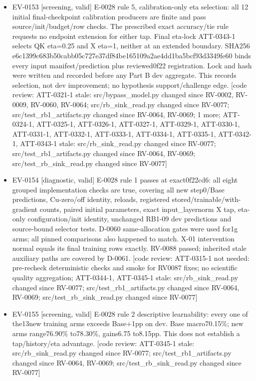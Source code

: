 \documentclass[11pt]{article}
\begin{document}
\begin{itemize}
\item EV-0153 [screening, valid] E-0028 rule 5, calibration-only eta selection: all 12 initial final-checkpoint calibration producers are finite and pass source/init/budget/row checks. The prescribed exact accuracy/tie rule requests no endpoint extension for either tap. Final eta-lock ATT-0343-1 selects QK eta=0.25 and X eta=1, neither at an extended boundary. SHA256 e6c1399c683b50cabb05c727e37df84be165109a2ae4dd1ba5bcf93d3349fe60 binds every input manifest/prediction plus reviewed0f22 registration. Lock and hash were written and recorded before any Part B dev aggregate. This records selection, not dev improvement; no hypothesis support/challenge edge. [code review: ATT-0321-1 stale: src/bypass\_model.py changed since RV-0002, RV-0009, RV-0060, RV-0064; src/rb\_sink\_read.py changed since RV-0077; src/test\_rb1\_artifacts.py changed since RV-0064, RV-0069; 1 more; ATT-0324-1, ATT-0325-1, ATT-0326-1, ATT-0327-1, ATT-0329-1, ATT-0330-1, ATT-0331-1, ATT-0332-1, ATT-0333-1, ATT-0334-1, ATT-0335-1, ATT-0342-1, ATT-0343-1 stale: src/rb\_sink\_read.py changed since RV-0077; src/test\_rb1\_artifacts.py changed since RV-0064, RV-0069; src/test\_rb\_sink\_read.py changed since RV-0077]
\item EV-0154 [diagnostic, valid] E-0028 rule 1 passes at exact0f22cd6: all eight grouped implementation checks are true, covering all new step0/Base predictions, Cu-zero/off identity, reloads, registered stored/trainable/with-gradient counts, paired initial parameters, exact input\_layernorm X tap, eta-only configuration/init identity, unchanged RB1-09 dev predictions and source-bound selector tests. D-0060 same-allocation gates were used for1g arms; all pinned comparisons also happened to match. X-01 intervention normal equals its final training rows exactly. RV-0088 passed; inherited stale auxiliary paths are covered by D-0061. [code review: ATT-0315-1 not needed: pre-recheck deterministic checks and smoke for RV0087 fixes; no scientific quality aggregation; ATT-0344-1, ATT-0345-1 stale: src/rb\_sink\_read.py changed since RV-0077; src/test\_rb1\_artifacts.py changed since RV-0064, RV-0069; src/test\_rb\_sink\_read.py changed since RV-0077]
\item EV-0155 [screening, valid] E-0028 rule 2 descriptive learnability: every one of the13new training arms exceeds Base+1pp on dev. Base macro70.15\%; new arms range76.90\% to78.30\%, gains6.75 to8.15pp. This does not establish a tap/history/eta advantage. [code review: ATT-0345-1 stale: src/rb\_sink\_read.py changed since RV-0077; src/test\_rb1\_artifacts.py changed since RV-0064, RV-0069; src/test\_rb\_sink\_read.py changed since RV-0077]

\end{itemize}
\end{document}
